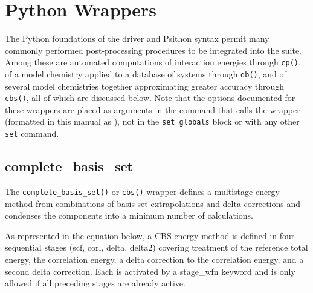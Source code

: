 \newcommand{\hiddensubsubsection}[1]{
\stepcounter{subsubsection}
\subsubsection*{\arabic{section}.\arabic{subsection}.\arabic{subsubsection}\hspace{1em}{#1}}}

\section{Python Wrappers\label{pywrappers}}

The Python foundations of the \PSIfour driver and Psithon syntax permit
many commonly performed post-processing procedures to be integrated into
the \PSIfour suite.
Among these are automated computations of interaction energies through
\texttt{cp()}, of a model chemistry applied to a database of systems through
\texttt{db()}, and of several model chemistries together approximating greater
accuracy through \texttt{cbs()}, all of which are discussed below.
Note that the options documented for these wrappers are placed as arguments
in the command that calls the wrapper (formatted in this manual as
 ),
not in the \texttt{set globals} block or with any other \texttt{set} command.

\subsection{complete\_basis\_set\label{wrapcbs}}

The \texttt{complete\_basis\_set()} or \texttt{cbs()} wrapper defines a
multistage energy method from combinations of basis set extrapolations
and delta corrections and condenses the components into a minimum
number of calculations.

As represented in the equation below, a CBS energy method is defined in
four sequential stages (scf, corl, delta, delta2) covering treatment of
the reference total energy, the correlation energy, a delta
correction to the correlation energy, and a second delta correction.
Each is activated by a stage\_wfn keyword and is only allowed if all
preceding stages are already active.

